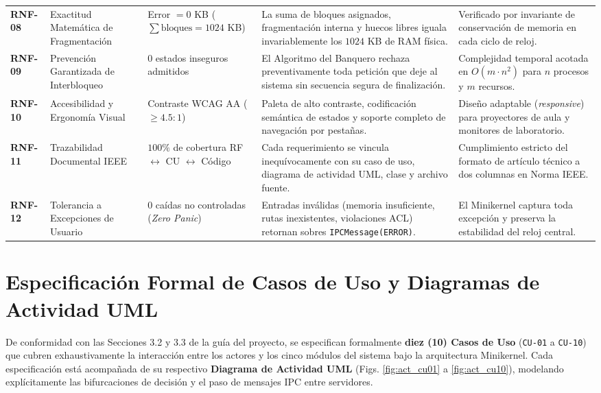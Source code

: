 \documentclass[10pt,twocolumn,letterpaper]{article}
\begin{document}
\begin{table}[!t]
\begin{tabularx}{\textwidth}{C{1.0cm} L{2.6cm} L{2.8cm} Y L{3.6cm}}
\textbf{RNF-08} & Exactitud Matem\'atica de Fragmentaci\'on & Error $= 0$ KB ($\sum \text{bloques} = 1024$ KB) & La suma de bloques asignados, fragmentaci\'on interna y huecos libres iguala invariablemente los $1024$ KB de RAM f\'isica. & Verificado por invariante de conservaci\'on de memoria en cada ciclo de reloj. \\
\textbf{RNF-09} & Prevenci\'on Garantizada de Interbloqueo & $0$ estados inseguros admitidos & El Algoritmo del Banquero rechaza preventivamente toda petici\'on que deje al sistema sin secuencia segura de finalizaci\'on. & Complejidad temporal acotada en $O(m \cdot n^2)$ para $n$ procesos y $m$ recursos. \\
\textbf{RNF-10} & Accesibilidad y Ergonom\'ia Visual & Contraste WCAG AA ($\ge 4.5:1$) & Paleta de alto contraste, codificaci\'on sem\'antica de estados y soporte completo de navegaci\'on por pesta\~nas. & Dise\~no adaptable (\textit{responsive}) para proyectores de aula y monitores de laboratorio. \\
\textbf{RNF-11} & Trazabilidad Documental IEEE & $100\%$ de cobertura RF $\leftrightarrow$ CU $\leftrightarrow$ C\'odigo & Cada requerimiento se vincula inequ\'ivocamente con su caso de uso, diagrama de actividad UML, clase y archivo fuente. & Cumplimiento estricto del formato de art\'iculo t\'ecnico a dos columnas en Norma IEEE. \\
\textbf{RNF-12} & Tolerancia a Excepciones de Usuario & $0$ ca\'idas no controladas (\textit{Zero Panic}) & Entradas inv\'alidas (memoria insuficiente, rutas inexistentes, violaciones ACL) retornan sobres \texttt{IPCMessage(ERROR)}. & El Minikernel captura toda excepci\'on y preserva la estabilidad del reloj central. \\
\bottomrule
\end{tabularx}
\end{table}

\section{Especificaci\'on Formal de Casos de Uso y Diagramas de Actividad UML}

De conformidad con las Secciones 3.2 y 3.3 de la gu\'ia del proyecto, se especifican formalmente \textbf{diez (10) Casos de Uso} (\texttt{CU-01} a \texttt{CU-10}) que cubren exhaustivamente la interacci\'on entre los actores y los cinco m\'odulos del sistema bajo la arquitectura Minikernel. Cada especificaci\'on est\'a acompa\~nada de su respectivo \textbf{Diagrama de Actividad UML} (Figs. \ref{fig:act_cu01} a \ref{fig:act_cu10}), modelando expl\'icitamente las bifurcaciones de decisi\'on y el paso de mensajes IPC entre servidores.
\end{document}
